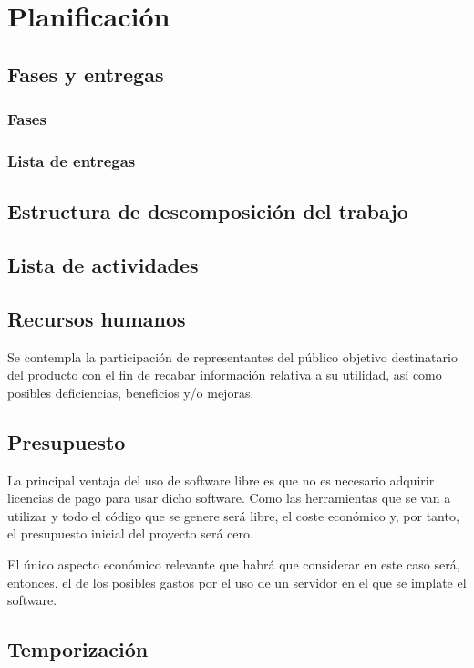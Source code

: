 \chapter{Planificación}

\section{Fases y entregas}

\subsection{Fases}

\subsection{Lista de entregas}

\section{Estructura de descomposición del trabajo}

\section{Lista de actividades}

\section{Recursos humanos}

Se contempla la participación de representantes del público objetivo destinatario del producto con el fin de recabar información relativa a su utilidad, así como posibles deficiencias, beneficios y/o mejoras.

\section{Presupuesto}

La principal ventaja del uso de software libre es que no es necesario adquirir licencias de pago para usar dicho software. Como las herramientas que se van a utilizar y todo el código que se genere será libre, el coste económico y, por tanto, el presupuesto inicial del proyecto será cero.

\bigskip

El único aspecto económico relevante que habrá que considerar en este caso será, entonces, el de los posibles gastos por el uso de un servidor en el que se implate el software.

\section{Temporización}
